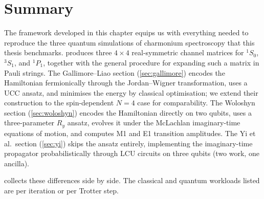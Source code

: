 \section{Summary}
\label{sec:framework-summary}

The framework developed in this chapter equips us with everything needed
to reproduce the three quantum simulations of charmonium spectroscopy
that this thesis benchmarks.  produces three
$4\times 4$ real-symmetric channel matrices for ${}^1S_0$, ${}^3S_1$,
and ${}^1P_1$, together with the general procedure for expanding such a
matrix in Pauli strings. The Gallimore--Liao section
(\cref{sec:gallimore}) encodes the Hamiltonian fermionically through the
Jordan--Wigner transformation, uses a UCC ansatz, and minimises the
energy by classical optimisation; we extend their construction to the
spin-dependent $N=4$ case for comparability. The Woloshyn section
(\cref{sec:woloshyn}) encodes the Hamiltonian directly on two qubits,
uses a three-parameter $R_y$ ansatz, evolves it under the McLachlan
imaginary-time equations of motion, and computes M1 and E1 transition
amplitudes. The Yi et al.\ section (\cref{sec:yi}) skips the ansatz
entirely, implementing the imaginary-time propagator probabilistically
through LCU circuits on three qubits (two work, one ancilla).

 collects these differences side by side. The
classical and quantum workloads listed are per iteration or per Trotter
step.

